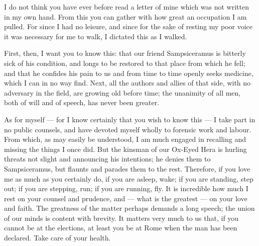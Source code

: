 

 I do not think you have ever before read a letter of mine which was not written in my own hand. From this you can gather with how great an occupation I am pulled. For since I had no leisure, and since for the sake of resting my poor voice it was necessary for me to walk, I dictated this as I walked.

 First, then, I want you to know this: that our friend Sampsiceramus is bitterly sick of his condition, and longs to be restored to that place from which he fell; and that he confides his pain to us and from time to time openly seeks medicine, which I can in no way find. Next, all the authors and allies of that side, with no adversary in the field, are growing old before time; the unanimity of all men, both of will and of speech, has never been greater.

 As for myself --- for I know certainly that you wish to know this --- I take part in no public counsels, and have devoted myself wholly to forensic work and labour. From which, as may easily be understood, I am much engaged in recalling and missing the things I once did. But the kinsman of our Ox-Eyed Hera is hurling threats not slight and announcing his intentions; he denies them to Sampsiceramus, but flaunts and parades them to the rest. Therefore, if you love me as much as you certainly do, if you are asleep, wake; if you are standing, step out; if you are stepping, run; if you are running, fly. It is incredible how much I rest on your counsel and prudence, and --- what is the greatest --- on your love and faith. The greatness of the matter perhaps demands a long speech; the union of our minds is content with brevity. It matters very much to us that, if you cannot be at the elections, at least you be at Rome when the man has been declared. Take care of your health.
